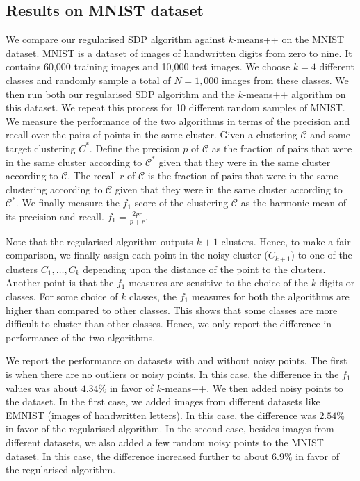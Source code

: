 \documentclass[12pt]{article}
\newcommand{\mc}{\mathcal}
\begin{document}
\subsection{Results on MNIST dataset}
We compare our regularised SDP algorithm against $k$-means++ on the MNIST dataset. MNIST is a dataset of images of handwritten digits from zero to nine. It contains 60,000 training images and 10,000 test images. We choose $k = 4$ different classes and randomly sample a total of $N = 1,000$ images from these classes.  We then run both our regularised SDP algorithm and the $k$-means++ algorithm on this dataset. We repeat this process for 10 different random samples of MNIST. We measure the performance of the two algorithms in terms of the precision and recall over the pairs of points in the same cluster. Given a clustering $\mc C$ and some target clustering $C^*$. Define the precision $p$ of $\mc C$ as the fraction of pairs that were in the same cluster according to $\mc C^*$ given that they were in the same cluster according to $\mc C$. The recall $r$ of $\mc C$ is the fraction of pairs that were in the same clustering according to $\mc C$ given that they were in the same cluster according to $\mc C^*$. We finally measure the $f_1$ score of the clustering $\mc C$ as the harmonic mean of its precision and recall. $f_1 = \frac{2pr}{p+r}$. 

Note that the regularised algorithm outputs $k+1$ clusters. Hence, to make a fair comparison, we finally assign each point in the noisy cluster ($C_{k+1}$) to one of the clusters $C_1, \ldots, C_k$ depending upon the distance of the point to the clusters. Another point is that the $f_1$ measures are sensitive to the choice of the $k$ digits or classes. For some choice of $k$ classes, the $f_1$ measures for both the algorithms are higher than compared to other classes. This shows that some classes are more difficult to cluster than other classes. Hence, we only report the difference in performance of the two algorithms. 

We report the performance on datasets with and without noisy points. The first is when there are no outliers or noisy points. In this case, the difference in the $f_1$ values was about $4.34\%$ in favor of $k$-means++. We then added noisy points to the dataset. In the first case, we added images from different datasets like EMNIST (images of handwritten letters). In this case, the difference was $2.54\%$ in favor of the regularised algorithm. In the second case, besides images from different datasets, we also added a few random noisy points to the MNIST dataset. In this case, the difference increased further to about $6.9\%$ in favor of the regularised algorithm. 
\end{document}

